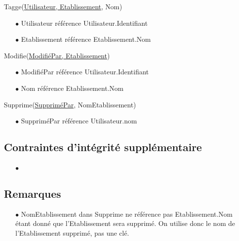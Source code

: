 \documentclass[a4paper, 11pt]{article}
\begin{document}
Tagge(\underline{Utilisateur, Etablissement}, Nom)
\begin{itemize}
	\item[$\bullet$] Utilisateur référence Utilisateur.Identifiant
	\item[$\bullet$] Etablissement référence Etablissement.Nom
\end{itemize}
Modifie(\underline{ModifiéPar, Etablissement})
\begin{itemize}
	\item[$\bullet$] ModifiéPar référence Utilisateur.Identifiant
	\item[$\bullet$] Nom référence Etablissement.Nom
\end{itemize}
Supprime({\underline{SuppriméPar}, NomEtablissement})
\begin{itemize}
	\item[$\bullet$] SuppriméPar référence Utilisateur.nom
\end{itemize}

\subsection*{Contraintes d'intégrité supplémentaire}
\begin{itemize}
	\item[$\bullet$] 
\end{itemize}

\subsection*{Remarques}
\begin{itemize}
	\item[$\bullet$] NomEtablissement dans Supprime ne référence pas Etablissement.Nom étant donné que l'Etablissement sera supprimé. On utilise donc le nom de l'Etablissement supprimé, pas une clé.
\end{itemize}
\end{document}
